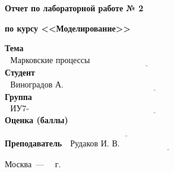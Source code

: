 \begin{titlepage}
	
	\begin{center}
		\Large\textbf{Отчет по лабораторной работе № 2}
		
		\Large\textbf{по курсу <<Моделирование>>}
		
		\textbf{\newline}		
	\end{center}
	
	\noindent\textbf{Тема} $\underline{\text{~~Марковские процессы~~~~~~~~~~~~~~~~~~~~~~~~~~~~~~~~~~~~~~~~~~~~~~~~~~~~~~~~~~~~~~~~~~~~~~~~}}$\newline\newline
	\noindent\textbf{Студент} $\underline{\text{~~Виноградов А. О.~~~~~~~~~~~~~~~~~~~~~~~~~~~~~~~~~~~~~~~~~~~~~~~~~~~~~~~~~~~~~~~~~~~~~~~~~~~~~~~~~~~~~~}}$\newline\newline
	\noindent\textbf{Группа} $\underline{\text{~~ИУ7-76Б~~~~~~~~~~~~~~~~~~~~~~~~~~~~~~~~~~~~~~~~~~~~~~~~~~~~~~~~~~~~~~~~~~~~~~~~~~~~~~~~~~~~~~~~~~~~~~~~~~~~}}$\newline\newline
	\noindent\textbf{Оценка (баллы)} $\underline{\textbf{~~~~~~~~~~~~~~~~~~~~~~~~~~~~~~~~~~~~~~~~~~~~~~~~~~~~~~~~~~~~~~~~~~~~~~~~~~~~~~~~~~~~~~~~}}$\newline\newline
	\noindent\textbf{Преподаватель} $\underline{\text{~~Рудаков И. В.~~~~~~~~~~~~~~~~~~~~~~~~~~~~~~~~~~~~~~~~~~~~~~~~~~~~~~~}}$\newline
	
	\begin{center}
		\vfill
		Москва~---~\the\year
		~г.
	\end{center}
	\restoregeometry
	
\end{titlepage}